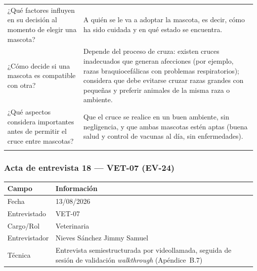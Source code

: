 \documentclass[journal,onecolumn]{IEEEtran}
\begin{document}
{\begin{longtable}{@{}p{5.6cm} p{9.4cm}@{}}
			¿Qué factores influyen en su decisión al momento de elegir una mascota? & A quién se le va a adoptar la mascota, es decir, cómo ha sido cuidada y en qué estado se encuentra. \\ \addlinespace
			
			¿Cómo decide si una mascota es compatible con otra? & Depende del proceso de cruza: existen cruces inadecuados que generan afecciones (por ejemplo, razas braquiocefálicas con problemas respiratorios); considera que debe evitarse cruzar razas grandes con pequeñas y preferir animales de la misma raza o ambiente. \\ \addlinespace
			
			¿Qué aspectos considera importantes antes de permitir el cruce entre mascotas? & Que el cruce se realice en un buen ambiente, sin negligencia, y que ambas mascotas estén aptas (buena salud y control de vacunas al día, sin enfermedades). \\ \addlinespace
			
		\end{longtable}
	}

	\subsubsection*{Acta de entrevista 18 --- VET-07 (EV-24)}

	\begin{table}[H]
		\centering\small
		\begin{tabularx}{\textwidth}{@{}l X@{}}
			\toprule
			\textbf{Campo} & \textbf{Información} \\
			\midrule
			
			Fecha & 13/08/2026 \\
			
			Entrevistado & VET-07 \\
			
			Cargo/Rol & Veterinaria \\
			
			Entrevistador & Nieves Sánchez Jimmy Samuel \\
			
			Técnica & Entrevista semiestructurada por videollamada, seguida de sesión de validación \emph{walkthrough} (Apéndice~B.7) \\
			
			\bottomrule
		\end{tabularx}
	\end{table}
\end{document}
